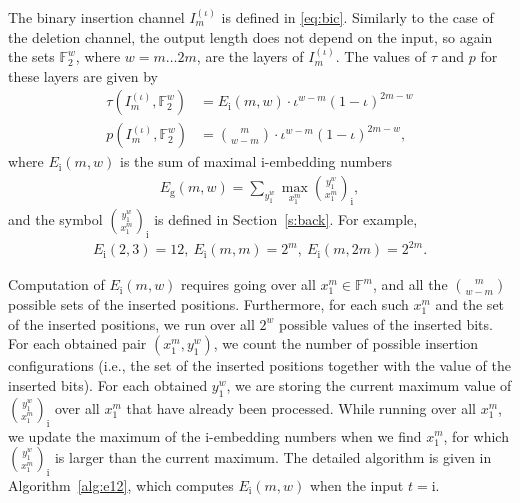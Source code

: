 \documentclass[journal, twocol]{IEEEtran}
\newcommand{\Ei}{{E_{\text{i}}}}
\newcommand{\Eg}{{E_{\text{g}}}}
\newcommand{\ibinom}[2]{{\binom{#1}{#2}_{\!\text{i}}}}
\newcommand{\bF}{{\mathbb{F}}}
\begin{document}
The binary insertion channel $I_m^{(\iota)}$ is defined in \eqref{eq:bic}.
Similarly to the case of the deletion channel, the output length does not depend on the input, so again the sets $\bF_2^w$, where $w=m\dots 2m$, are the layers of $I_m^{(\iota)}$.
The values of $\tau$ and $p$ for these layers are given by
\begin{align}
\tau(I^{(\iota)}_m, \bF_2^w)&= \Ei(m,w) \cdot \iota^{w-m}(1-\iota)^{2m-w}
\label{eq:tauI}
\\
p(I^{(\iota)}_m, \bF_2^w)&=\binom{m}{w-m}\cdot \iota^{w-m}(1-\iota)^{2m-w},
\label{eq:pI}
\end{align}
where $\Ei(m,w)$ is the sum of maximal i-embedding numbers 
\begin{align}
\Eg(m,w)=\sum_{y_1^w} \max_{x_1^m} \ibinom{y_1^w}{x_1^m},
\label{eq:E1wm}
\end{align}
and the symbol $\ibinom{y_1^w}{x_1^m}$ is defined in Section~\ref{s:back}.
For example, 
\begin{gather}
\Ei(2,3)=12,\ \Ei(m,m)=2^m,\ \Ei(m,2m)=2^{2m}.
\label{eq:e1example}
\end{gather}

Computation of $\Ei(m,w)$ requires going over all $x_1^m\in \bF^m$, and all the $\binom{m}{w-m}$ possible sets of the inserted positions.
Furthermore, for each such $x_1^m$ and the set of the inserted positions, we run over all $2^w$ possible values of the inserted bits.
For each obtained pair $(x_1^m,y_1^w)$, we count the number of possible insertion configurations (i.e., the set of the inserted positions together with the value of the inserted bits).
For each obtained $y_1^w$, we are storing the current maximum value of $\ibinom{y_1^w}{x_1^m}$ over all $x_1^m$ that have already been processed.
While running over all $x_1^m$, we update the maximum of the i-embedding numbers when we find $x_1^m$, for which $\ibinom{y_1^w}{x_1^m}$ is larger than the current maximum.
The detailed algorithm is given in Algorithm~\ref{alg:e12}, which computes $\Ei(m,w)$ when the input $t=\text{i}$.
\end{document}
